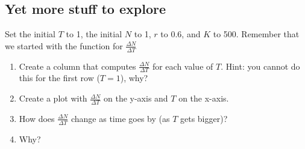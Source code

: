 \documentclass[]{book}
\providecommand{\tightlist}{%
  \setlength{\itemsep}{0pt}\setlength{\parskip}{0pt}}
\begin{document}
\subsection{Yet more stuff to explore}\label{yet-more-stuff-to-explore}

Set the initial \(T\) to 1, the initial \(N\) to 1, \(r\) to 0.6, and
\(K\) to 500. Remember that we started with the function for
\(\frac{\Delta N}{\Delta T}\)

\begin{enumerate}
\def\labelenumi{\arabic{enumi}.}
\setcounter{enumi}{8}
\tightlist
\item
  Create a column that computes \(\frac{\Delta N}{\Delta T}\) for each
  value of \(T\). Hint: you cannot do this for the first row (\(T=1\)),
  why?
\item
  Create a plot with \(\frac{\Delta N}{\Delta T}\) on the y-axis and
  \(T\) on the x-axis.
\item
  How does \(\frac{\Delta N}{\Delta T}\) change as time goes by (as
  \(T\) gets bigger)?
\item
  Why?
\end{enumerate}


\end{document}
